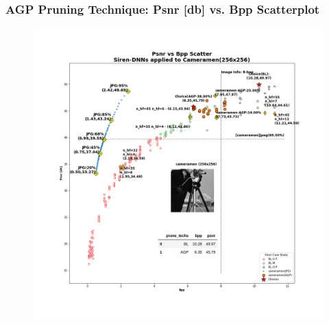 
\begin{frame}
\frametitle{AGP Pruning Technique: Psnr [db] vs. Bpp Scatterplot}

    \begin{figure}
    \includegraphics[scale=0.22]{slides/experiments/pruning-tech/images/cameramen_jpeg_pruned_siren_1.png}
    \end{figure}

\end{frame}
